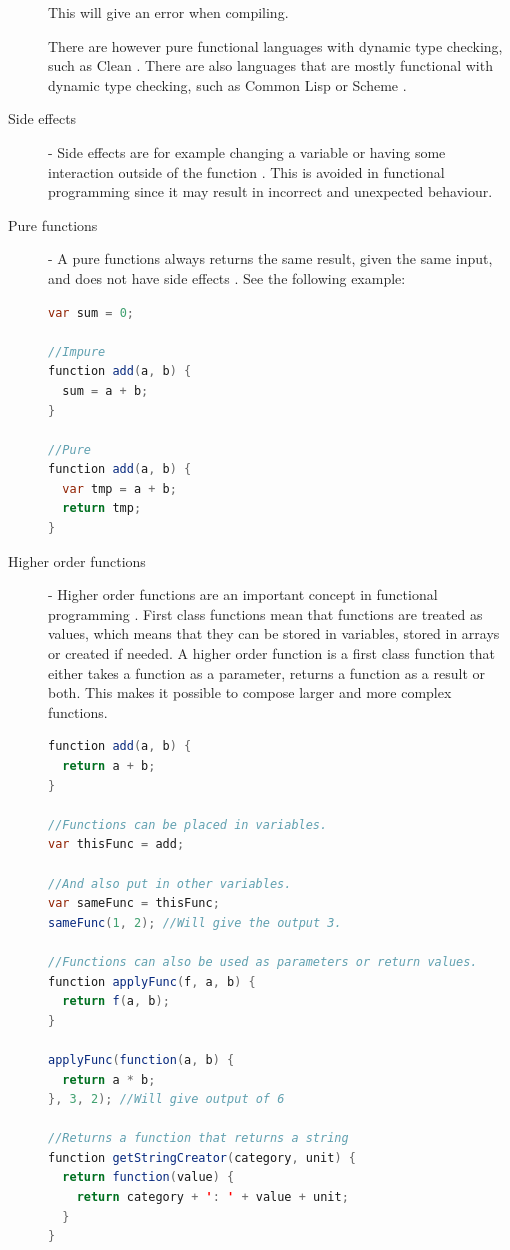 \documentclass {article}
\begin{document}
\begin{description}
\item [ ] This will give an error when compiling.
\item[] There are however pure functional languages with dynamic type checking, such as Clean \cite{clean}. There are also languages that are mostly functional with dynamic type checking, such as Common Lisp \cite{commonLisp} or Scheme \cite{scheme} \cite{langTable}.
\item [Side effects] - Side effects are for example changing a variable or having some interaction outside of the function \cite{drboolean}. This is avoided in functional programming since it may result in incorrect and unexpected behaviour. 
\item [Pure functions] - A pure functions always returns the same result, given the same input, and does not have side effects \cite{drboolean}. See the following example: 

\begin{lstlisting}[language=Java]
var sum = 0;

//Impure
function add(a, b) {
  sum = a + b;
}

//Pure
function add(a, b) {
  var tmp = a + b;
  return tmp;
}
\end{lstlisting}

\item [Higher order functions] - Higher order functions are an important concept in functional programming \cite{fogus}. First class functions mean that functions are treated as values, which means that they can be stored in variables, stored in arrays or created if needed. A higher order function is a first class function that either takes a function as a parameter, returns a function as a result or both. This makes it possible to compose larger and more complex functions.

\begin{lstlisting}[language=Java, breaklines=true]
function add(a, b) {
  return a + b;
}

//Functions can be placed in variables.
var thisFunc = add;

//And also put in other variables.
var sameFunc = thisFunc;
sameFunc(1, 2); //Will give the output 3.

//Functions can also be used as parameters or return values.
function applyFunc(f, a, b) {
  return f(a, b);
}

applyFunc(function(a, b) {
  return a * b;
}, 3, 2); //Will give output of 6

//Returns a function that returns a string
function getStringCreator(category, unit) {
  return function(value) {
    return category + ': ' + value + unit;
  }
}


\end{lstlisting}
\end{description}
\end{document}
